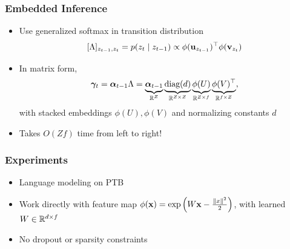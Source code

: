 \documentclass{beamer}
\begin{document}
\begin{frame}
\frametitle{Embedded Inference}
\begin{itemize}
\item Use generalized softmax in transition distribution
$$[\Lambda]_{z_{t-1},z_t} = p(z_t\mid z_{t-1}) \propto \phi(\mathbf{u}_{z_{t-1}})^\top\phi(\mathbf{v}_{z_t})$$
\item In matrix form,
\begin{equation*}
\bm\gamma_t = \bm\alpha_{t-1}\Lambda =
\underbrace{\bm\alpha_{t-1}}_{\mathbb{R}^Z}
\underbrace{\textrm{diag}(d)}_{\mathbb{R}^{Z \times Z}}
\underbrace{\phi(U)}_{\mathbb{R}^{Z \times f}}
\underbrace{\phi(V)^\top}_{\mathbb{R}^{f \times Z}},
\end{equation*}
with stacked embeddings $\phi(U),\phi(V)$
and normalizing constants $d$
\vspace{1em}
\item Takes $O(Zf)$ time from left to right!
\end{itemize}
\end{frame}

\begin{frame}
\frametitle{Experiments}
\begin{itemize}
\item Language modeling on PTB
\vspace{2em}
\item Work directly with feature map $\phi(\mathbf{x}) = \exp\left(W\mathbf{x} - \frac{\|x\|^2}{2}\right)$,
with learned $W\in\mathbb{R}^{d \times f}$
\vspace{2em}
\item No dropout or sparsity constraints
\end{itemize}
\end{frame}

\end{document}
